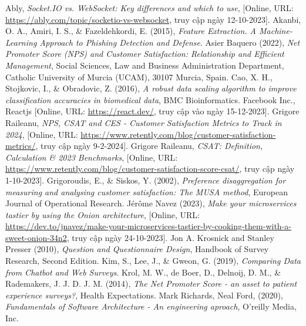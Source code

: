 \begin{thebibliography}{9}
     Ably, \textit{Socket.IO vs. WebSocket: Key differences and which to use}, [Online, URL: \url{https://ably.com/topic/socketio-vs-websocket}, truy cập ngày 12-10-2023].
     Akanbi, O. A., Amiri, I. S., \& Fazeldehkordi, E. (2015), \textit{Feature Extraction. A Machine-Learning Approach to Phishing Detection and Defense}.
     Asier Baquero (2022), \textit{Net Promoter Score (NPS) and Customer Satisfaction: Relationship and Efficient Management}, Social Sciences, Law and Business Administration Department, Catholic University of Murcia (UCAM), 30107 Murcia, Spain.
     Cao, X. H., Stojkovic, I., \& Obradovic, Z. (2016), \textit{A robust data scaling algorithm to improve classification accuracies in biomedical data}, BMC Bioinformatics.
     Facebook Inc., Reactjs [Online, URL: \url{https://react.dev/}, truy cập vào ngày 15-12-2023].
     Grigore Raileanu, \textit{NPS, CSAT and CES - Customer Satisfaction Metrics to Track in 2024}, [Online, URL: \url{https://www.retently.com/blog/customer-satisfaction-metrics/}, truy cập ngày 9-2-2024].
     Grigore Raileanu, \textit{CSAT: Definition, Calculation \& 2023 Benchmarks}, [Online, URL: \url{https://www.retently.com/blog/customer-satisfaction-score-csat/}, truy cập ngày 1-10-2023].
     Grigoroudis, E., \& Siskos, Y. (2002), \textit{Preference disaggregation for measuring and analysing customer satisfaction: The MUSA method}, European Journal of Operational Research.
     Jérôme Navez (2023), \textit{Make your microservices tastier by using the Onion architecture}, [Online, URL: \href{https://dev.to/jnavez/make-your-microservices-tastier-by-cooking-them-with-a-sweet-onion-34n2}{https://dev.to/jnavez/make-your-microservices-tastier-by-cooking-them-with-a-sweet-onion-34n2}, truy cập ngày 24-10-2023].
     Jon A. Krosnick and Stanley Presser (2010), \textit{Question and Questionnaire Design}, Handbook of Survey Research, Second Edition.
     Kim, S., Lee, J., \& Gweon, G. (2019), \textit{Comparing Data from Chatbot and Web Surveys}.
     Krol, M. W., de Boer, D., Delnoij, D. M., \& Rademakers, J. J. D. J. M. (2014), \textit{The Net Promoter Score - an asset to patient experience surveys?}, Health Expectations.
     Mark Richards, Neal Ford, (2020), \textit{Fundamentals of Software Architecture - An engineering aproach}, O’reilly Media, Inc.

\end{thebibliography}
